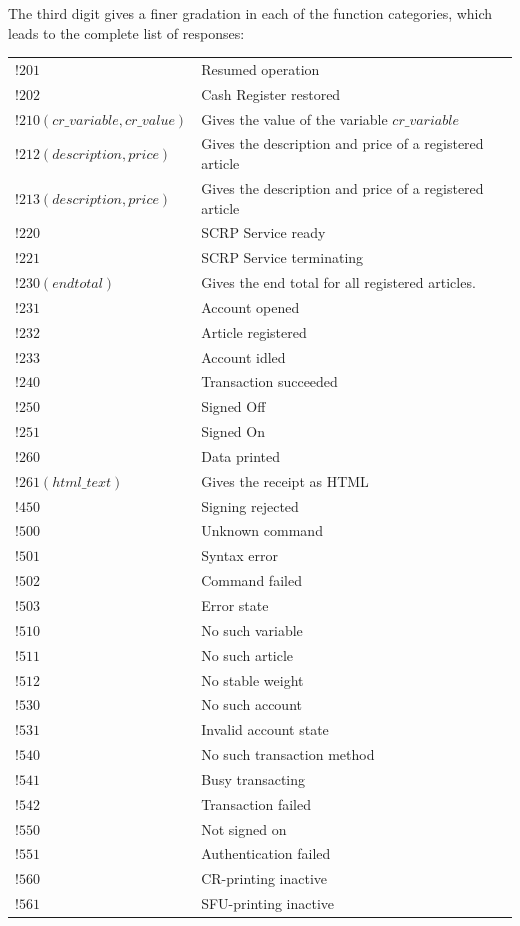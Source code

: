 The third digit gives a finer gradation in each of the function categories, which leads to the complete list of responses:
\vspace{5px} \\
\begin{tabular}{ll}
$!201$ & Resumed operation\\ 
$!202$ & Cash Register restored\\ 
$!210(cr\_variable, cr\_value)$ & Gives the value of the variable $\mathit{cr\_variable}$\\ 
$!212(description,price)$ & Gives the description and price of a registered article\\ 
$!213(description,price)$ & Gives the description and price of a registered article\\ 
$!220$ & SCRP Service ready\\ 
$!221$ & SCRP Service terminating\\ 
$!230(endtotal)$ & Gives the end total for all registered articles.\\ 
$!231$ & Account opened\\ 
$!232$ & Article registered\\ 
$!233$ & Account idled\\ 
$!240$ & Transaction succeeded\\ 
$!250$ & Signed Off\\ 
$!251$ & Signed On\\ 
$!260$ & Data printed\\ 
$!261(html\_text)$ & Gives the receipt as HTML\\ 
$!450$ & Signing rejected\\ 
$!500$ & Unknown command\\ 
$!501$ & Syntax error\\ 
$!502$ & Command failed\\ 
$!503$ & Error state \\ 
$!510$ & No such variable\\ 
$!511$ & No such article\\ 
$!512$ & No stable weight\\ 
$!530$ & No such account\\ 
$!531$ & Invalid account state\\ 
$!540$ & No such transaction method\\ 
$!541$ & Busy transacting\\ 
$!542$ & Transaction failed\\ 
$!550$ & Not signed on\\ 
$!551$ & Authentication failed\\ 
$!560$ & CR-printing inactive \\
$!561$ & SFU-printing inactive
\end{tabular}

